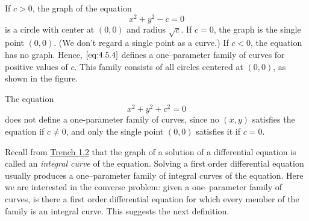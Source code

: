 \documentclass{ximera}
\begin{document}
 
 
\begin{example}\label{example:4.5.3}
If $c>0$,  the graph of the equation
\begin{equation} \label{eq:4.5.4}
x^2+y^2-c=0
\end{equation}
is a circle with center at $(0,0)$ and radius $\sqrt{c}$. If $c=0$, the
graph is the single point $(0,0)$. (We don't regard a single point as
a curve.) If $c<0$, the equation has no graph. Hence, $\eqref{eq:4.5.4}$
defines a one--parameter family of curves for positive values of $c$.
This family consists of all circles centered at $(0,0)$, as shown in the figure.

\begin{center}
\end{center}
 
 
\end{example}
 
\begin{example}\label{example:4.5.4}
 The equation
$$
x^2+y^2+c^2=0
$$
does not define a one-parameter family of curves, since no $(x,y)$
satisfies the equation if $c\neq 0$, and only the single point $(0,0)$
satisfies it if $c=0$.
\end{example}
 
Recall from \href{https://ximera.osu.edu/ode/main/basicConcepts/basicConcepts}{Trench 1.2} that the graph of a solution of a
differential equation is called an \textit{integral curve} of the
equation. Solving a first order differential equation usually produces
a one--parameter family of integral curves of the equation. Here we
are interested in the converse problem:
given a one--parameter family of curves, is there a first order
differential equation for which every  member of the family is an integral
curve.
This suggests the next definition.
 
\end{document}
